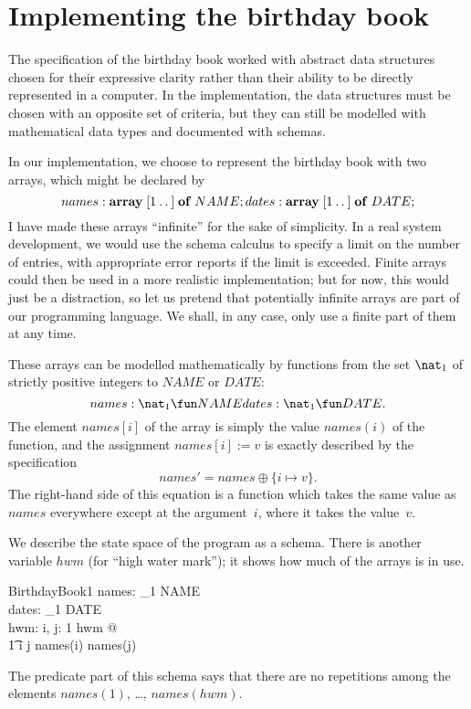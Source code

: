 \documentclass[12pt]{article}
\newcommand{\Array}{\mathrel{\bf array}}
\newcommand{\Of}{\mathrel{\bf of}}
\begin{document}
\section{Implementing the birthday book}

The specification of the birthday book worked with abstract data structures
chosen for their expressive clarity rather than their ability to be directly
represented in a computer. In the implementation, the data structures must
be chosen with an opposite set of criteria, but they can still be modelled
with mathematical data types and documented with schemas.

In our implementation, we choose to represent the birthday book with two
arrays, which might be declared by
\[
	names:\;\Array [1\upto{}] \Of NAME; \\
	dates:\;\Array [1\upto{}] \Of DATE;
\]
I have made these arrays ``infinite'' for the sake of simplicity. In
a real system development, we would use the schema calculus to specify
a limit on the number of entries, with appropriate error reports if
the limit is exceeded. Finite arrays could then be used in a more
realistic implementation; but for now, this would just be a distraction,
so let us pretend that potentially infinite arrays are part of our
programming language. We shall, in any case, only use a finite part of
them at any time.

These arrays can be modelled mathematically by functions from the set
$\nat_1$ of strictly positive integers to $NAME$ or $DATE$:
\[
	names: \nat_1 \fun NAME \\
	dates: \nat_1 \fun DATE.
\]
The element $names[i]$ of the array is simply the value $names(i)$ of
the function, and the assignment
$names[i] := v$
is exactly described by the specification
\[
	names' = names \oplus \{i\mapsto v\}.
\]
The right-hand side of this equation is a function which takes the
same value as $names$ everywhere except at the argument~$i$, where it
takes the value~$v$.

We describe the state space of the program as a schema. There is
another variable $hwm$ (for ``high water mark''); it shows how much of
the arrays is in use.
\begin{schema}{BirthdayBook1}
	names: \nat_1 \fun NAME \\
	dates: \nat_1 \fun DATE \\
	hwm: \nat
\where
	\forall i, j: 1 \upto hwm @ \\
\t1		i \neq j \implies names(i) \neq names(j)
\end{schema}
The predicate part of this schema says that there are no repetitions
among the elements $names(1)$, \dots, $names(hwm)$.
\end{document}
